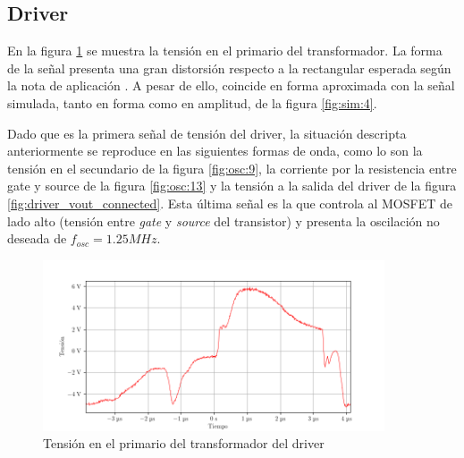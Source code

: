 

\subsection{Driver}




    
En la figura \ref{fig:osc:7} se muestra la tensión en el primario del transformador. 
La forma de la señal presenta una gran distorsión respecto a la rectangular esperada según la nota de aplicación \cite{gatedrivers}.
A pesar de ello, coincide en forma aproximada con la señal simulada, tanto en forma como en amplitud, de la figura \ref{fig:sim:4}.

Dado que es la primera señal de tensión del driver, la situación descripta anteriormente se reproduce en las siguientes formas de onda, como lo son la tensión en el secundario de la figura \ref{fig:osc:9}, la corriente por la resistencia entre gate y source de la figura \ref{fig:osc:13} y la tensión a la salida del driver de la figura \ref{fig:driver_vout_connected}.
Esta última señal es la que controla al MOSFET de lado alto (tensión entre \textit{gate} y \textit{source} del transistor) y presenta la oscilación no deseada de $f_{osc}=1.25MHz$.

\begin{figure}[H]
    \centering
    \includegraphics[width=0.9\textwidth]{images/capturas-osciloscopio/17-11-2022/7.png}
    \caption{Tensión en el primario del transformador del driver}
    \label{fig:osc:7}
\end{figure}

